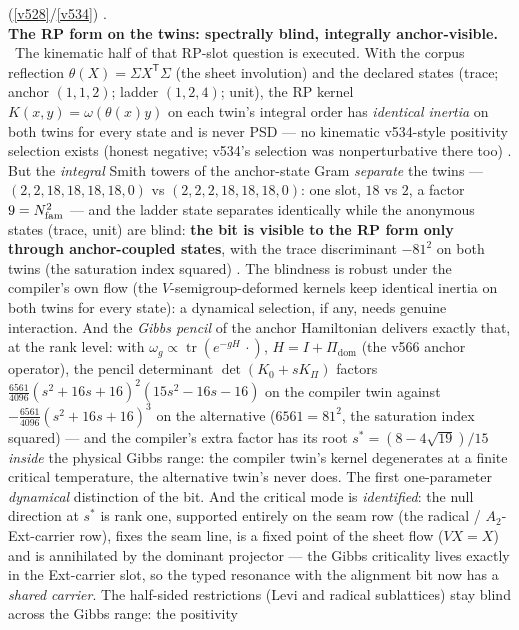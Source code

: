 \begin{winbox}
(\vref{v528}/\vref{v534}) \mO.
\smallskip\\
\noindent\textbf{The RP form on the twins: spectrally blind, integrally anchor-visible.}
\ The kinematic half of that RP-slot question is executed.  With the
corpus reflection $\theta(X)=\Sigma X^{\mathsf T}\Sigma$ (the sheet involution) and the declared
states (trace; anchor $(1,1,2)$; ladder $(1,2,4)$; unit), the RP kernel
$K(x,y)=\omega(\theta(x)y)$ on each twin's integral order has \emph{identical inertia} on both
twins for every state and is never PSD --- no kinematic v534-style positivity selection exists
(honest negative; v534's selection was nonperturbative there too) \mE.  But the \emph{integral}
Smith towers of the anchor-state Gram \emph{separate} the twins --- $(2,2,18,18,18,18,0)$ vs
$(2,2,2,18,18,18,0)$: one slot, $18$ vs $2$, a factor $9=N_{\mathrm{fam}}^2$ --- and the ladder state
separates identically while the anonymous states (trace, unit) are blind: \textbf{the bit is
visible to the RP form only through anchor-coupled states}, with the trace discriminant
$-81^2$ on both twins (the saturation index squared) \mE.  The blindness is robust under the
compiler's own flow (the $V$-semigroup-deformed kernels keep identical inertia on both twins
for every state): a dynamical selection, if any, needs genuine interaction.  And the
\emph{Gibbs pencil} of the anchor Hamiltonian delivers exactly that, at the rank level: with
$\omega_g\propto\operatorname{tr}(e^{-gH}\,\cdot)$, $H=I+\Pi_{\mathrm{dom}}$ (the v566
anchor operator), the pencil determinant $\det(K_0+sK_\Pi)$ factors
$\tfrac{6561}{4096}(s^2{+}16s{+}16)^2(15s^2{-}16s{-}16)$ on the compiler twin against
$-\tfrac{6561}{4096}(s^2{+}16s{+}16)^3$ on the alternative ($6561=81^2$, the saturation index
squared) --- and the compiler's extra factor has its root $s^*=(8-4\sqrt{19})/15$ \emph{inside}
the physical Gibbs range: the compiler twin's kernel degenerates at a finite critical
temperature, the alternative twin's never does.  The first one-parameter \emph{dynamical}
distinction of the bit.  And the critical mode is \emph{identified}: the null direction at
$s^*$ is rank one, supported entirely on the seam row (the radical / $A_2$-Ext-carrier row),
fixes the seam line, is a fixed point of the sheet flow ($VX=X$) and is annihilated by the
dominant projector --- the Gibbs criticality lives exactly in the Ext-carrier slot, so the
typed resonance with the alignment bit now has a \emph{shared carrier}.  The half-sided
restrictions (Levi and radical sublattices) stay blind across the Gibbs range: the positivity

\end{winbox}
